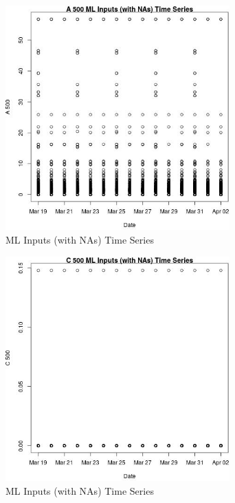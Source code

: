\begin{figure} 
\centering  
\includegraphics[width=0.77\textwidth]{Code_Outputs/Report_ML_input_PM25_Step4_part_e_de_duplicated_aveswNAs_A_500vDate.jpg} 
\caption{\label{fig:Report_ML_input_PM25_Step4_part_e_de_duplicated_aveswNAsA_500vDate}ML Inputs (with NAs) Time Series} 
\end{figure} 
 

\begin{figure} 
\centering  
\includegraphics[width=0.77\textwidth]{Code_Outputs/Report_ML_input_PM25_Step4_part_e_de_duplicated_aveswNAs_C_500vDate.jpg} 
\caption{\label{fig:Report_ML_input_PM25_Step4_part_e_de_duplicated_aveswNAsC_500vDate}ML Inputs (with NAs) Time Series} 
\end{figure} 
 

